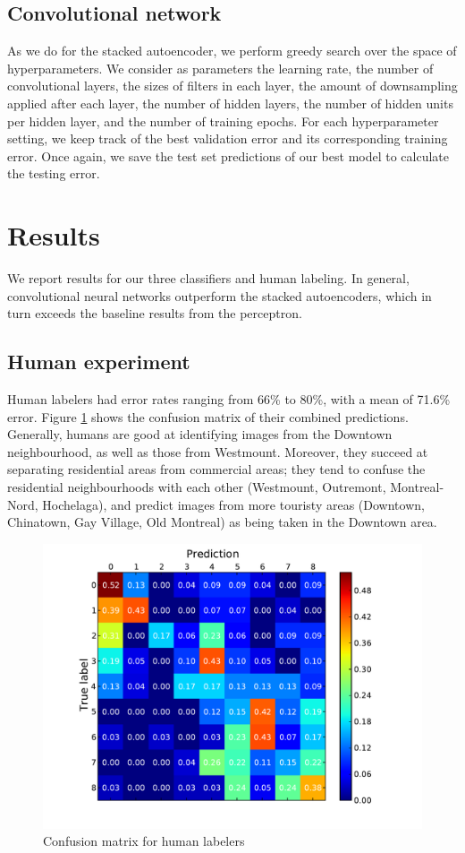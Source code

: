 \documentclass{acm_proc_article-sp}
\begin{document}
\subsection{Convolutional network}
As we do for the stacked autoencoder, we perform greedy search over the space of hyperparameters. We consider as parameters the learning rate, the number of convolutional layers, the sizes of filters in each layer, the amount of downsampling applied after each layer, the number of hidden layers, the number of hidden units per hidden layer, and the number of training epochs. For each hyperparameter setting, we keep track of the best validation error and its corresponding training error. Once again, we save the test set predictions of our best model to calculate the testing error.

\section{Results}
We report results for our three classifiers and human labeling. In general, convolutional neural networks outperform the stacked autoencoders, which in turn exceeds the baseline results from the perceptron.

\subsection{Human experiment}

Human labelers had error rates ranging from 66\% to 80\%, with a mean of 71.6\% error. Figure \ref{fig:human-conf} shows the confusion matrix of their combined predictions. Generally, humans are good at identifying images from the Downtown neighbourhood, as well as those from Westmount. Moreover, they succeed at separating residential areas from commercial areas; they tend to confuse the residential neighbourhoods with each other (Westmount, Outremont, Montreal-Nord, Hochelaga), and predict images from more touristy areas (Downtown, Chinatown, Gay Village, Old Montreal) as being taken in the Downtown area.

\begin{figure}[h!]
\includegraphics[width=\linewidth]{human_confusion.pdf}
		\caption{Confusion matrix for human labelers}
		\label{fig:human-conf}
\end{figure}
\end{document}
